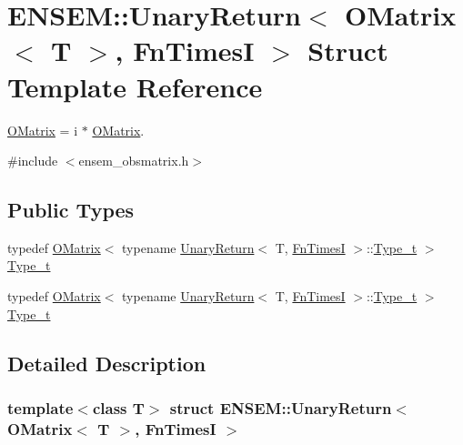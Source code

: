 \hypertarget{structENSEM_1_1UnaryReturn_3_01OMatrix_3_01T_01_4_00_01FnTimesI_01_4}{}\section{E\+N\+S\+EM\+:\+:Unary\+Return$<$ O\+Matrix$<$ T $>$, Fn\+TimesI $>$ Struct Template Reference}
\label{structENSEM_1_1UnaryReturn_3_01OMatrix_3_01T_01_4_00_01FnTimesI_01_4}


\mbox{\hyperlink{classENSEM_1_1OMatrix}{O\+Matrix}} = i $\ast$ \mbox{\hyperlink{classENSEM_1_1OMatrix}{O\+Matrix}}.  




{\ttfamily \#include $<$ensem\+\_\+obsmatrix.\+h$>$}

\subsection*{Public Types}
\begin{DoxyCompactItemize}
\item 
typedef \mbox{\hyperlink{classENSEM_1_1OMatrix}{O\+Matrix}}$<$ typename \mbox{\hyperlink{structENSEM_1_1UnaryReturn}{Unary\+Return}}$<$ T, \mbox{\hyperlink{structENSEM_1_1FnTimesI}{Fn\+TimesI}} $>$\+::\mbox{\hyperlink{structENSEM_1_1UnaryReturn_3_01OMatrix_3_01T_01_4_00_01FnTimesI_01_4_a823208991719b80307ceb78f0448f0de}{Type\+\_\+t}} $>$ \mbox{\hyperlink{structENSEM_1_1UnaryReturn_3_01OMatrix_3_01T_01_4_00_01FnTimesI_01_4_a823208991719b80307ceb78f0448f0de}{Type\+\_\+t}}
\item 
typedef \mbox{\hyperlink{classENSEM_1_1OMatrix}{O\+Matrix}}$<$ typename \mbox{\hyperlink{structENSEM_1_1UnaryReturn}{Unary\+Return}}$<$ T, \mbox{\hyperlink{structENSEM_1_1FnTimesI}{Fn\+TimesI}} $>$\+::\mbox{\hyperlink{structENSEM_1_1UnaryReturn_3_01OMatrix_3_01T_01_4_00_01FnTimesI_01_4_a823208991719b80307ceb78f0448f0de}{Type\+\_\+t}} $>$ \mbox{\hyperlink{structENSEM_1_1UnaryReturn_3_01OMatrix_3_01T_01_4_00_01FnTimesI_01_4_a823208991719b80307ceb78f0448f0de}{Type\+\_\+t}}
\end{DoxyCompactItemize}


\subsection{Detailed Description}
\subsubsection*{template$<$class T$>$\newline
struct E\+N\+S\+E\+M\+::\+Unary\+Return$<$ O\+Matrix$<$ T $>$, Fn\+Times\+I $>$}

